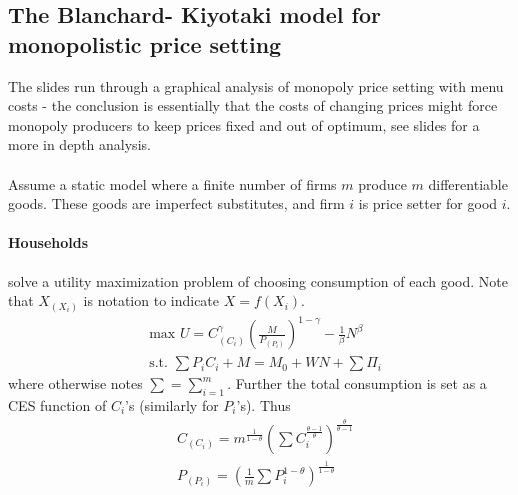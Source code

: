 \documentclass[12pt, a4paper]{article}
\begin{document}
\begin{spacing}{1.213}
\subsection{The Blanchard- Kiyotaki model for monopolistic price setting}
The slides run through a graphical analysis of monopoly price setting with menu costs - the conclusion is essentially that the costs of changing prices might force monopoly producers to keep prices fixed and out of optimum, see slides for a more in depth analysis. 
\\ \\ 
Assume a static model where a finite number of firms $m$ produce $m$ differentiable goods. These goods are imperfect substitutes, and firm $i$ is price setter for good $i$. 

\paragraph{Households} solve a utility maximization problem of choosing consumption of each good. Note that $X_{(X_i)}$ is notation to indicate $X=f(X_i)$.
\begin{align*}
&\textrm{max } U = C_{(C_i)}^{\gamma} \left( \frac{M}{P_{(P_i)}} \right)^{1-\gamma} - \frac{1}{\beta}N^{\beta} \\
& \textrm{s.t. } \sum P_i C_i + M = M_0 + WN + \sum \Pi_i
\end{align*}
where otherwise notes $\sum = \sum_{i=1}^m$. Further the total consumption is set as a CES function of $C_i$'s (similarly for $P_i$'s). Thus 
\begin{align*}
&C_{(C_i)} = m^{\frac{1}{1-\theta}} \left( \sum C_i^{\frac{\theta-1}{\theta}} \right)^{\frac{\theta}{\theta -1}} \\ 
& P_{(P_i)} = \left( \frac{1}{m} \sum P_i^{1-\theta} \right)^{\frac{1}{1-\theta}}
\end{align*}


\end{spacing}
\end{document}
